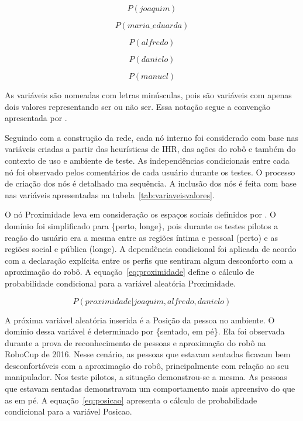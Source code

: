 \begin{equation}
	\label{eq:joaquim}
	P(joaquim)
\end{equation}

\begin{equation}
	\label{eq:mariaeduarda}
	P(maria\_eduarda)
\end{equation}

\begin{equation}
	\label{eq:alfredo}
	P(alfredo)
\end{equation}

\begin{equation}
	\label{eq:danielo}
	P(danielo)
\end{equation}

\begin{equation}
	\label{eq:manuel}
	P(manuel)
\end{equation}

As variáveis são nomeadas com letras minúsculas, pois são variáveis com apenas dois valores representando ser ou não ser. Essa notação segue a convenção apresentada por .

Seguindo com a construção da rede, cada nó interno foi considerado com base nas variáveis criadas a partir das heurísticas de IHR, das ações do robô e também do contexto de uso e ambiente de teste. As independências condicionais entre cada nó foi observado pelos comentários de cada usuário durante os testes. O processo de criação dos nós é detalhado ma sequência. A inclusão dos nós é feita com base nas variáveis apresentadas na tabela~\ref{tab:variaveisvalores}.

O nó Proximidade leva em consideração os espaços sociais definidos por . O domínio foi simplificado para \{perto, longe\}, pois durante os testes pilotos a reação do usuário era a mesma entre as regiões íntima e pessoal (perto) e as regiões social e pública (longe). A dependência condicional foi aplicada de acordo com a declaração explícita entre os perfis que sentiram algum desconforto com a aproximação do robô. A equação~\ref{eq:proximidade} define o cálculo de probabilidade condicional para a variável aleatória Proximidade.

\begin{equation}
	\label{eq:proximidade}
	P(proximidade | joaquim, alfredo, danielo)
\end{equation}

A próxima variável aleatória inserida é a Posição da pessoa no ambiente. O domínio dessa variável é determinado por \{sentado, em pé\}. Ela foi observada durante a prova de reconhecimento de pessoas e aproximação do robô na RoboCup de 2016. Nesse cenário, as pessoas que estavam sentadas ficavam bem desconfortáveis com a aproximação do robô, principalmente com relação ao seu manipulador. Nos teste pilotos, a situação demonstrou-se a mesma. As pessoas que estavam sentadas demonstravam um comportamento mais apreensivo do que as em pé. A equação~\ref{eq:posicao} apresenta o cálculo de probabilidade condicional para a variável Posicao.

